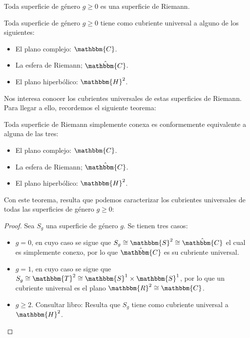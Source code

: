 \documentclass[12pt]{report}
\theoremstyle{largebreak}
\newcommand{\bbm}[1]{\ensuremath{\mathbbm{#1}}}
\begin{document}
    \begin{exa}
        Toda superficie de género $g\geq0$ es una superficie de Riemann. 
    \end{exa}

    \begin{propo}
        Toda superficie de género $g\geq0$ tiene como cubriente universal a alguno de los siguientes:
        \begin{itemize}
            \item El plano complejo: $\bbm{C}$.
            \item La esfera de Riemann; $\hat{\bbm{C}}$.
            \item El plano hiperbólico: $\bbm{H}^2$.
        \end{itemize}
    \end{propo}

    Nos interesa conocer los cubrientes universales de estas superficies de Riemann. Para llegar a ello, recordemos el siguiente teorema:

    \begin{theor}
        Toda superficie de Riemann simplemente conexa es conformemente equivalente a alguna de las tres:
        \begin{itemize}
            \item El plano complejo: $\bbm{C}$.
            \item La esfera de Riemann; $\hat{\bbm{C}}$.
            \item El plano hiperbólico: $\bbm{H}^2$.
        \end{itemize}
    \end{theor}

    Con este teorema, resulta que podemos caracterizar los cubrientes universales de todas las superficies de género $g\geq0$:

    \begin{proof}
        Sea $S_g$ una superficie de género $g$. Se tienen tres casos:
        \begin{itemize}
            \item $g=0$, en cuyo caso se sigue que $S_g\cong\bbm{S}^2\cong\hat{\bbm{C}}$ el cual es simplemente conexo, por lo que $\hat{\bbm{C}}$ es su cubriente universal.
            \item $g=1$, en cuyo caso se sigue que $S_g\cong\bbm{T}^2\cong\bbm{S}^1\times\bbm{S}^1$, por lo que un cubriente universal es el plano $\bbm{R}^2\cong\bbm{C}$.
            \item $g\geq2$. Consultar libro: Resulta que $S_g$ tiene como cubriente universal a $\bbm{H}^2$.
        \end{itemize}
    \end{proof}
\end{document}
